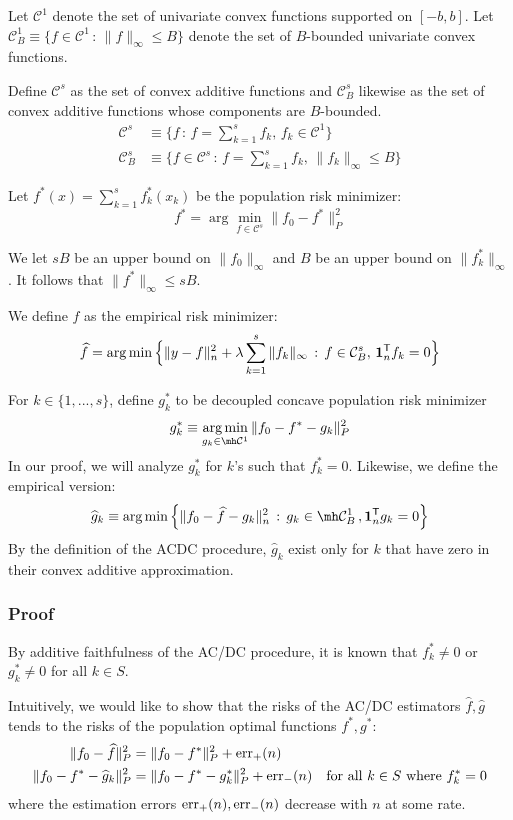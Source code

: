 Let $\mathcal{C}^1$ denote the set of univariate convex functions supported on $[-b,b]$. Let $\mathcal{C}^1_B \equiv \{ f \in \mathcal{C}^1 \,:\, \| f \|_\infty \leq B \}$ denote the set of $B$-bounded univariate convex functions. 

Define $\mathcal{C}^s$ as the set of convex additive functions and $\mathcal{C}^s_B$ likewise as the set of convex additive functions whose components are $B$-bounded.
\begin{align*}
\mathcal{C}^s &\equiv \{ f \,:\, f = \sum_{k=1}^s f_k, \,
   f_k \in \mathcal{C}^1 \} \\
\mathcal{C}^s_B &\equiv \{ f \in \mathcal{C}^s \,:\, 
f = \sum_{k=1}^s f_k, \, \| f_k \|_\infty \leq B \}
\end{align*}

Let $f^*(x) = \sum_{k=1}^s f^*_k(x_k)$ be the population risk minimizer:
\[
f^* = \arg\min_{f \in \mathcal{C}^s} \| f_0 - f^* \|_P^2
\]

We let $sB$ be an upper bound on $\| f_0 \|_\infty$ and $B$ be an upper bound on $\| f^*_k \|_\infty$. It follows that $\|f^* \|_\infty \leq s B$.

We define $\hat{f}$ as the empirical risk minimizer:
\[
\widehat{f} = \arg\min \Big \{ \| y - f \|_n^2 + \lambda \sum_{k=1}^s \| f_k \|_\infty 
    \,:\, f \in \mathcal{C}^s_B,\, \mbox{\boldmath $1$}_n^{\mathsf{T}} f_k = 0 \Big \}
\]

For $k \in \{1,...,s\}$, define $g^*_k$ to be decoupled concave population risk minimizer
\[
g^*_k \equiv \argmin_{g_k \in \mh \mathcal{C}^1} \| f_0 - f^* - g_k \|_P^2 
\]
In our proof, we will analyze $g^*_k$ for $k$'s such that $f^*_k = 0$. Likewise, we define the empirical version:
\[
\hat{g}_k \equiv \argmin \Big\{ \| f_0 - \hat{f} - g_k \|_n^2 \,:\, g_k \in \mh \mathcal{C}^1_B \,, \mathbf{1}_n^\tran g_k = 0 \Big\}
\]
By the definition of the ACDC procedure, $\hat{g}_k$ exist only for $k$ that have zero in their convex additive approximation.


\subsubsection{Proof}
 
By additive faithfulness of the AC/DC procedure, it is known that $f^*_k \neq 0$ or $g^*_k \neq 0$ for all $k \in S$. 


Intuitively, we would like to show that the risks of the AC/DC estimators $\hat{f}, \hat{g}$ tends to the risks of the population optimal functions $f^*, g^*$:
\begin{align*}
\| f_0 - \widehat{f} \|^2_P & = \| f_0 - f^* \|^2_P + \textrm{err}_+(n) \\
\| f_0 - f^* - \widehat{g}_k \|^2_P &=  \| f_0 - f^* - g^*_k \|^2_P + \textrm{err}_-(n) 
       \quad \textrm{for all $k \in S$ where $f^*_k = 0$}
\end{align*}
where the estimation errors $\textrm{err}_+(n), \textrm{err}_-(n)$ decrease with $n$ at some rate. 

